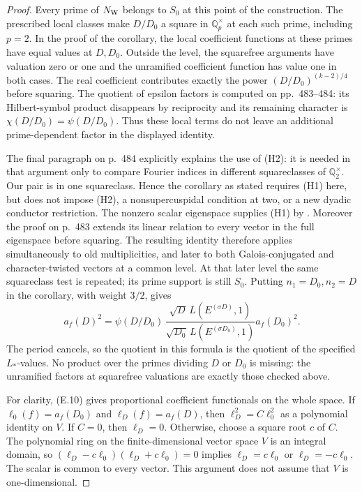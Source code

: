 \begin{proof}
Every prime of $N_{\rm W}$ belongs to $S_0$ at this point of the
construction. The prescribed local classes make $D/D_0$ a square
in $\mathbb Q_p^\times$ at each such prime, including $p=2$.
In the proof of the corollary, the local coefficient functions
at these primes have equal values at $D,D_0$. Outside the level,
the squarefree arguments have valuation zero or one and the
unramified coefficient function has value one in both cases.
The real coefficient contributes exactly the power
$(D/D_0)^{(k-2)/4}$ before squaring. The quotient of epsilon
factors is computed on pp.~483--484: its Hilbert-symbol product
disappears by reciprocity and its remaining character is
$\chi(D/D_0)=\psi(D/D_0)$. Thus these local terms do not leave
an additional prime-dependent factor in the displayed identity.

The final paragraph on p.~484 explicitly explains the use of
(H2): it is needed in that argument only to compare Fourier
indices in different squareclasses of $\mathbb Q_2^\times$.
Our pair is in one squareclass. Hence the corollary as stated
requires (H1) here, but does not impose (H2), a nonsupercuspidal
condition at two, or a new dyadic conductor restriction. The
nonzero scalar eigenspace supplies (H1) by
\cite[Proposition~2, p.~377]{waldspurger}. Moreover the proof on
p.~483 extends its linear relation to every vector in the full
eigenspace before squaring. The resulting identity therefore
applies simultaneously to old multiplicities, and later to both
Galois-conjugated and character-twisted vectors at a common level.
At that later level the same squareclass test is repeated; its
prime support is still $S_0$.
Putting $n_1=D_0,n_2=D$ in the corollary, with weight $3/2$, gives
\[
 a_f(D)^2=
 \psi(D/D_0)\,
 \frac{\sqrt D\,L(E^{(\sigma D)},1)}
      {\sqrt{D_0}\,L(E^{(\sigma D_0)},1)}
 a_f(D_0)^2.                                      \tag{E.10}
\]
The period cancels, so the quotient in this formula is the quotient
of the specified $L_*$-values. No product over the primes dividing
$D$ or $D_0$ is missing: the unramified factors at squarefree
valuations are exactly those checked above.

For clarity, (E.10) gives proportional coefficient functionals on
the whole space. If $\ell_0(f)=a_f(D_0)$ and $\ell_D(f)=a_f(D)$,
then $\ell_D^2=C\ell_0^2$ as a polynomial identity on $V$.
If $C=0$, then $\ell_D=0$. Otherwise, choose a square root $c$ of
$C$. The polynomial ring on the finite-dimensional vector space
$V$ is an integral domain, so
$(\ell_D-c\ell_0)(\ell_D+c\ell_0)=0$ implies
$\ell_D=c\ell_0$ or $\ell_D=-c\ell_0$.
The scalar is common to every vector. This argument does not
assume that $V$ is one-dimensional.


\end{proof}
